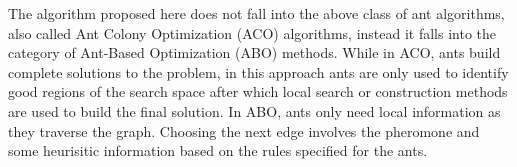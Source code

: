 \begin{spacing}{1.5}
\indent The algorithm proposed here does not fall into the above class of ant algorithms, also called Ant Colony Optimization (ACO) algorithms, instead it falls into the category of Ant-Based Optimization (ABO) methods. While in ACO, ants build complete solutions to the problem, in this approach ants are only used to identify good regions of the search space after which local search or construction methods are used to build the final solution. In ABO, ants only need local information as they traverse the graph. Choosing the next edge involves the pheromone and some heurisitic information based on the rules specified for the ants.

\end{spacing}